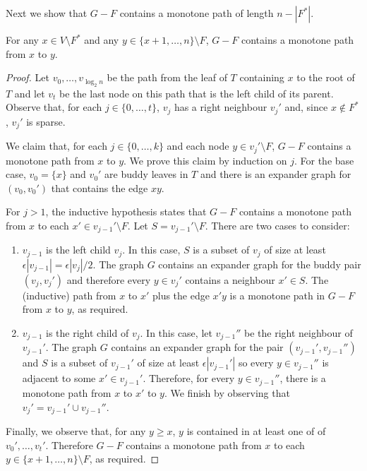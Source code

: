 \documentclass{patmorin}
\begin{document}
Next we show that $G-F$ contains a monotone path of length $n-|F^*|$.

\begin{clm}
  For any $x\in V\setminus F^*$ and any $y\in \{x+1,\ldots,n\}\setminus
  F$, $G-F$ contains a monotone path from $x$ to $y$.
\end{clm}

\begin{proof}
  Let $v_0,\ldots,v_{\log_2 n}$ be the path from the leaf of $T$
  containing $x$ to the root of $T$ and let $v_t$ be the last node on
  this path that is the left child of its parent.  Observe that, for
  each $j\in\{0,\ldots,t\}$, $v_j$ has a right neighbour $v_j'$ and,
  since $x\not\in F^*$, $v_j'$ is sparse.

  We claim that, for each $j\in\{0,\ldots,k\}$ and each node $y\in
  v_j'\setminus F$, $G-F$ contains a monotone path from $x$ to $y$.
  We prove this claim by induction on $j$.  For the base case, $v_0=\{x\}$
  and $v_0'$ are buddy leaves in $T$ and there is an expander graph
  for $(v_0,v_0')$
  that contains the edge $xy$.

  For $j>1$, the inductive hypothesis states that $G-F$ contains
  a monotone path from $x$ to each $x'\in v_{j-1}'\setminus F$.
  Let $S=v_{j-1}'\setminus F$.  There are two cases to consider:
  \begin{enumerate}
    \item $v_{j-1}$ is the left child $v_{j}$.  In this case,
	  $S$ is a subset of $v_j$ of size at least $\epsilon|v_{j-1}|
	  = \epsilon|v_j|/2$.  The graph $G$ contains an expander graph
	  for the buddy pair $(v_j,v_j')$ and therefore every $y\in v_j'$
	  contains a neighbour $x'\in S$.  The (inductive) path from
	  $x$ to $x'$ plus the edge $x'y$ is a monotone path in $G-F$
	  from $x$ to $y$, as required.

    \item $v_{j-1}$ is the right child of $v_j$.	In this case, let
	  $v_{j-1}''$ be the right neighbour of $v_{j-1}'$.
	  The graph $G$ contains an expander graph for the pair
	  $(v_{j-1}',v_{j-1}'')$ and $S$ is a subset of $v_{j-1}'$ of
	  size at least $\epsilon|v_{j-1}'|$ so every $y\in v_{j-1}''$ is
	  adjacent to some $x'\in v_{j-1}'$.  Therefore, for every $y\in
	  v_{j-1}''$, there is a monotone path from $x$ to $x'$ to $y$.
	  We finish by observing that $v_j' = v_{j-1}'\cup v_{j-1}''$.
  \end{enumerate}
  Finally, we observe that, for any $y\ge x$, $y$ is contained in at least one of of $v_0',\ldots,v_t'$.  Therefore $G-F$ contains a monotone path from $x$ to each $y\in\{x+1,\ldots,n\}\setminus F$, as required.
\end{proof}
\end{document}
